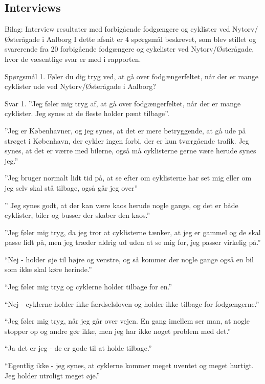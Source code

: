 \appendix
\label{appendix_start}

\begin{appendics}
  \chapter{Interviews}
  \label{chap:interviews}
 Bilag: Interview resultater med forbigående fodgængere og cyklister ved Nytorv/Østerågade i Aalborg 
I dette afsnit er 4 spørgsmål beskrevet, som blev stillet og svarerende fra 20 forbigående fodgængere og cykelister ved Nytorv/Østerågade, hvor de væsentlige svar er med i rapporten.  
 
Spørgsmål 1.  
Føler du dig tryg ved, at gå over fodgængerfeltet, når der er mange cyklister ude ved Nytorv/Østerågade i Aalborg?

Svar 1. 
”Jeg føler mig tryg af, at gå over fodgængerfeltet, når der er mange cyklister. Jeg synes at de fleste holder pænt tilbage”.

”Jeg er Københavner, og jeg synes, at det er mere betryggende, at gå ude på strøget i København, der cykler ingen forbi, der er kun tværgående trafik. Jeg synes, at det er værre med bilerne, også må cyklisterne gerne være herude synes jeg.”

”Jeg bruger normalt lidt tid på, at se efter om cyklisterne har set mig eller om jeg selv skal stå tilbage, også går jeg over”

” Jeg synes godt, at der kan være kaos herude nogle gange, og det er både cyklister, biler og busser der skaber den kaos.”

”Jeg føler mig tryg, da jeg tror at cyklisterne tænker, at jeg er gammel og de skal passe lidt på, men jeg træder aldrig ud uden at se mig for, jeg passer virkelig på.”

“Nej - holder øje til højre og venstre, og så kommer der nogle gange også en bil som ikke skal køre herinde.”

“Jeg føler mig tryg og cyklerne holder tilbage for en.”

“Nej - cyklerne holder ikke færdselsloven og holder ikke tilbage for fodgængerne.”

“Jeg føler mig tryg, når jeg går over vejen. En gang imellem ser man, at nogle stopper op og andre gør ikke, men jeg har ikke noget problem med det.” 

“Ja det er jeg - de er gode til at holde tilbage.”

“Egentlig ikke - jeg synes, at cyklerne kommer meget uventet og meget hurtigt. Jeg holder utroligt meget øje.”


\end{appendics}

